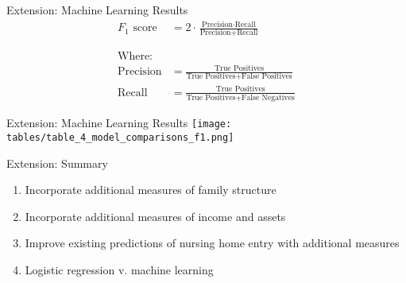 \documentclass[10pt]{beamer}
\begin{document}
\begin{frame}{Extension: Machine Learning Results}
    \begin{align*}
        F_1 \text{ score} & = 2 \cdot \frac{\text{Precision} \cdot \text{Recall}}{\text{Precision} + \text{Recall}} \\
        & \\
        & \\
        \text{Where:         } & \\
        \text{Precision} & = \frac{\text{True Positives}}{\text{True Positives} + \text{False Positives}} \\
        \text{Recall} & = \frac{\text{True Positives}}{\text{True Positives} + \text{False Negatives}}
    \end{align*}
\end{frame}

\begin{frame}{Extension: Machine Learning Results}
    \hspace*{-0.55cm}
    \texttt{[image: tables/table\_4\_model\_comparisons\_f1.png]}
\end{frame}

\begin{frame}{Extension: Summary}
    \begin{enumerate}
        \item Incorporate additional measures of family structure \\
        \item Incorporate additional measures of income and assets \\
        \item Improve existing predictions of nursing home entry with additional measures \\
        \item Logistic regression v. machine learning
    \end{enumerate}
\end{frame}
\end{document}
